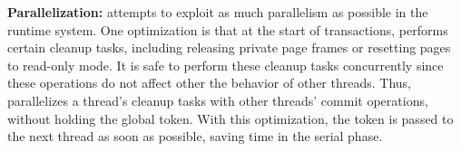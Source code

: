 \textbf{Parallelization: }
\dthreads{} attempts to exploit as much parallelism as possible in the runtime system. One optimization is that at the start of transactions, \dthreads{} performs certain cleanup tasks, including releasing private page frames or resetting pages to read-only mode. It is safe to perform these cleanup tasks concurrently since these operations do not affect other the behavior of other threads.
Thus, \dthreads{} parallelizes a thread's cleanup tasks with other threads’ commit operations, without holding the global token. With this optimization, the token is passed to the next thread as soon as possible, saving time in the serial phase. 